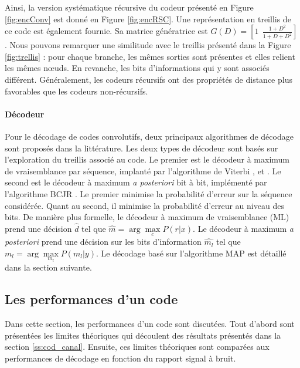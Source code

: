 Ainsi, la version systématique récursive du codeur présenté en Figure \ref{fig:encConv} est donné en Figure 
\ref{fig:encRSC}. Une représentation en treillis de ce code est également fournie. Sa matrice génératrice est $G(D) = \left[ 1 ~~\frac{1+D^2}{1+D+D^2} \right]$. 
Nous pouvons remarquer une similitude avec le treillis présenté dans la Figure \ref{fig:trellis} : pour chaque branche,
les mêmes sorties sont présentes et elles relient les mêmes nœuds. En revanche, les bits d'informations qui y sont 
associés différent. Généralement, les codeurs récursifs ont des propriétés de distance plus favorables que les codeurs
non-récursifs.

\paragraph*{Décodeur}\label{sec:ml}
Pour le décodage de codes convolutifs, deux principaux algorithmes de décodage sont proposés dans la littérature. Les 
deux types de décodeur sont basés sur l'exploration du treillis associé au code. Le premier est le décodeur à maximum de 
vraisemblance par séquence, implanté par l'algorithme de Viterbi \cite{forney73viterbi}, \cite{viterbi} et \cite{viterbi2}. 
Le second est le décodeur à maximum {\it a posteriori} bit à bit, implémenté par l'algorithme BCJR \cite{bcjr}. Le premier 
minimise la probabilité d'erreur sur la séquence considérée.
Quant au second, il minimise la probabilité d'erreur au niveau des bits. De 
manière plus formelle, le décodeur à maximum de vraisemblance (ML) prend une décision $\hat{d}$ tel que $\hat{m} = 
\arg\max\limits_c P(r|x)$. Le décodeur à maximum {\it a posteriori} prend une décision sur les bits d'information 
$\hat{m_l}$ tel que $\hat{m_l} = \arg\max\limits_{m_l} P(m_l|y)$. Le décodage basé sur l'algorithme MAP est détaillé 
dans la section suivante.


\subsection{Les performances d'un code}
Dans cette section, les performances d'un code sont discutées. Tout d'abord sont présentées les limites théoriques qui 
découlent des résultats présentés dans la section \ref{ss:cod_canal}. Ensuite, ces limites théoriques sont comparées aux 
performances de décodage en fonction du rapport signal à bruit.
